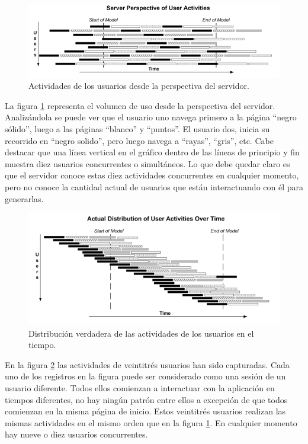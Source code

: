 \begin{figure} [h!]
\centering
\includegraphics[width=1\textwidth]{figuras/libro_azul/perspectiva_servidor_actividad_usuario.png}
	\caption{Actividades de los usuarios desde la perspectiva del servidor.}
  	\label{fig.serv_act_usu}
\end{figure}

La figura \ref{fig.serv_act_usu} representa el volumen de uso desde la perspectiva del servidor. Analizándola se puede ver que el usuario uno navega primero a la página ``negro
sólido'', luego a las páginas ``blanco'' y ``puntos''. El usuario dos, inicia su recorrido en ``negro solido'', pero luego navega a ``rayas'', ``gris'', etc. Cabe destacar que una línea vertical en el
gráfico dentro de las líneas de principio y fin muestra diez usuarios concurrentes o simultáneos. Lo que debe quedar claro es que el servidor conoce estas diez actividades
concurrentes en cualquier momento, pero no conoce la cantidad actual de usuarios que están interactuando con él para generarlas.

\begin{figure}[h]
\centering
\includegraphics[width=1\textwidth]{figuras/libro_azul/distribucion_actual_actividad_usuarios_en_el_tiempo.png}
  \caption{Distribución verdadera de las actividades de los usuarios en el tiempo.}
  \label{fig.distr_verd_usuarios}
\end{figure}

En la figura \ref{fig.distr_verd_usuarios} las actividades de veintitrés usuarios han sido capturadas. Cada uno de los registros en la figura puede ser considerado como una sesión de un usuario diferente. Todos ellos comienzan a interactuar con la aplicación en tiempos diferentes, no hay ningún patrón entre ellos a excepción de que todos comienzan en la misma
página de inicio. Estos veintitrés usuarios realizan las mismas actividades en el mismo orden que en la figura \ref{fig.serv_act_usu}. En cualquier momento hay nueve o diez
usuarios concurrentes.

